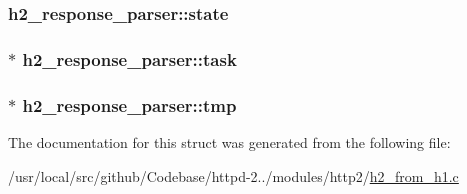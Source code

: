 \subsubsection[{\texorpdfstring{state}{state}}]{ h2\+\_\+response\+\_\+parser\+::state}\hypertarget{structh2__response__parser_a2dca95fd3da88f6198a4a0ee29273ae3}{}\label{structh2__response__parser_a2dca95fd3da88f6198a4a0ee29273ae3}
\subsubsection[{\texorpdfstring{task}{task}}]{$\ast$ h2\+\_\+response\+\_\+parser\+::task}\hypertarget{structh2__response__parser_a884c4a419a3bdc78b5f60c15b62f07e0}{}\label{structh2__response__parser_a884c4a419a3bdc78b5f60c15b62f07e0}
\subsubsection[{\texorpdfstring{tmp}{tmp}}]{$\ast$ h2\+\_\+response\+\_\+parser\+::tmp}\hypertarget{structh2__response__parser_ada2850b1f7954862e6c79804e071d785}{}\label{structh2__response__parser_ada2850b1f7954862e6c79804e071d785}


The documentation for this struct was generated from the following file\+:\begin{DoxyCompactItemize}
\item 
/usr/local/src/github/\+Codebase/httpd-\/2../modules/http2/\hyperlink{h2__from__h1_8c}{h2\+\_\+from\+\_\+h1.\+c}\end{DoxyCompactItemize}
